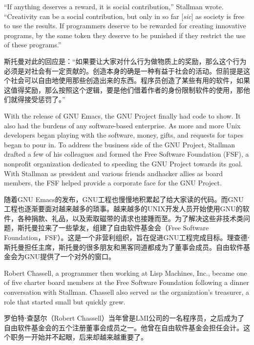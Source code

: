 \ifdefined\eng
``If anything deserves a reward, it is social contribution,'' Stallman wrote. ``Creativity can be a social contribution, but only in so far [\textit{sic}] as society is free to use the results. If programmers deserve to be rewarded for creating innovative programs, by the same token they deserve to be punished if they restrict the use of these programs.''
\fi

\ifdefined\chs
斯托曼对此的回应是：``如果要让大家对什么行为做物质上的奖励，那么这个行为必须是对社会有一定贡献的。创造本身的确是一种有益于社会的活动。但前提是这个社会可以自由地使用那些创造出来的东西。程序员创造了某些有用的软件，如果这值得奖励，那么按照这个逻辑，要是他们借着作者的身份限制软件的使用，那他们就得接受惩罚了。''
\fi

\ifdefined\eng
With the release of GNU Emacs, the GNU Project finally had code to show. It also had the burdens of any software-based enterprise. As more and more Unix developers began playing with the software, money, gifts, and requests for tapes began to pour in. To address the business side of the GNU Project, Stallman drafted a few of his colleagues and formed the Free Software Foundation (FSF), a nonprofit organization dedicated to speeding the GNU Project towards its goal. With Stallman as president and various \ifdefined\vtwo friends and\fi hacker allies as board members, the FSF helped provide a corporate face for the GNU Project.
\fi

\ifdefined\chs
随着GNU Emacs的发布，GNU工程也慢慢地积累起了给大家读的代码。而GNU工程也逐渐要面对越来越多的琐事。越来越多的UNIX开发人员开始使用GNU的软件，各种捐款、礼品，以及索取磁带的请求也接踵而至。为了解决这些非技术类问题，斯托曼拉来了一些挚友，组建了自由软件基金会（Free Software Foundation，FSF）。这是一个非营利组织，旨在促进GNU工程完成目标。理查德⋅斯托曼担任主席，斯托曼的很多朋友和黑客同道都成为了董事会成员。自由软件基金会为GNU提供了一个对外的窗口。
\fi

\ifdefined\eng
Robert Chassell, a programmer then working at Lisp Machines, Inc., became one of five charter board members at the Free Software Foundation following a dinner conversation with Stallman. Chassell also served as the organization's treasurer, a role that started small but quickly grew.
\fi

\ifdefined\chs
罗伯特⋅查瑟尔（Robert Chassell）当年曾是LMI公司的一名程序员，之后成为了自由软件基金会的五个注册董事会成员之一。他曾在自由软件基金会担任会计。这个职务一开始并不起眼，后来却越来越重要了。
\fi

